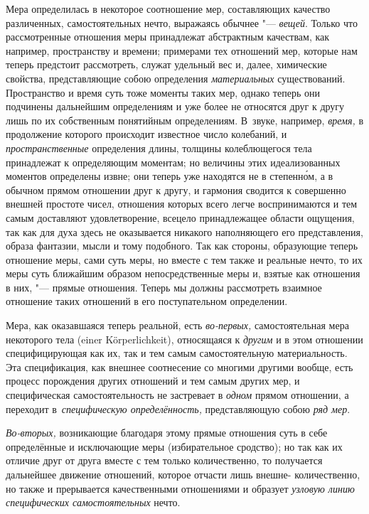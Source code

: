 Мера определилась в некоторое соотношение мер, составляющих качество
различенных, самостоятельных нечто, выражаясь обычнее "--- {\em вещей}.
Только что рассмотренные отношения меры принадлежат абстрактным качествам, как
например, пространству и времени; примерами тех отношений мер, которые нам
теперь предстоит рассмотреть, служат удельный вес и, далее, химические
свойства, представляющие собою определения {\em материальных} существований.
Пространство и время суть тоже моменты таких мер, однако теперь они подчинены
дальнейшим определениям и уже более не относятся друг к другу лишь по их
собственным понятийным определениям. В~звуке, например, {\em время,}
в продолжение которого происходит известное число колебаний,
и {\em пространственные} определения длины, толщины колеблющегося тела
принадлежат к определяющим моментам; но величины этих идеализованных моментов
определены извне; они теперь уже находятся не в степенн\'{о}м, а в обычном
прямом отношении друг к другу, и гармония сводится к совершенно внешней
простоте чисел, отношения которых всего легче воспринимаются и тем самым
доставляют удовлетворение, всецело принадлежащее области ощущения, так как для
духа здесь не оказывается никакого наполняющего его представления, образа
фантазии, мысли и тому подобного. Так как стороны, образующие теперь отношение
меры, сами суть меры, но вместе с тем также и реальные нечто, то их меры суть
ближайшим образом непосредственные меры и, взятые как отношения в них, "---
прямые отношения. Теперь мы должны рассмотреть взаимное отношение таких
отношений в его поступательном определении.

Мера, как оказавшаяся теперь реальной, есть {\em во-первых,} самостоятельная
мера некоторого тела (einer Körper\-lich\-keit), относящаяся к {\em другим} и в
этом отношении специфицирующая как их, так и тем самым самостоятельную
материальность. Эта спецификация, как внешнее соотнесение со многими другими
вообще, есть процесс порождения других отношений и тем самым других мер, и
специфическая самостоятельность не застревает в {\em одном} прямом отношении,
а переходит в~{\em специфическую определённость,} представляющую собою
{\em ряд мер}.

{\em Во-вторых,} возникающие благодаря этому прямые отношения суть в себе
определённые и исключающие меры (избирательное сродство); но так как их отличие
друг от друга вместе с тем только количественно, то получается дальнейшее
движение отношений, которое отчасти лишь внешне- количественно, но также
и прерывается качественными отношениями и образует {\em узловую линию
специфических самостоятельных} нечто.

